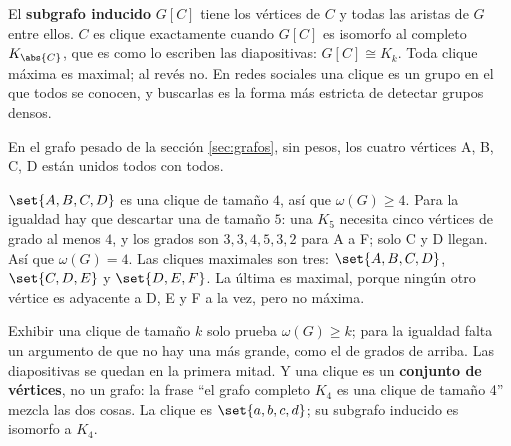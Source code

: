 \documentclass[11pt,letterpaper]{article}
\begin{document}
El \textbf{subgrafo inducido} $G[C]$ tiene los vértices de $C$ y todas
las aristas de $G$ entre ellos. $C$ es clique exactamente cuando
$G[C]$ es isomorfo al completo $K_{\abs{C}}$, que es como lo escriben
las diapositivas: $G[C] \cong K_k$. Toda clique máxima es maximal; al
revés no. En redes sociales una clique es un grupo en el que todos se
conocen, y buscarlas es la forma más estricta de detectar grupos
densos.

\begin{ejemplo}
  \label{ej:clique-pesado}
  En el grafo pesado de la sección \ref{sec:grafos}, sin pesos, los
  cuatro vértices A, B, C, D están unidos todos con todos.
  \begin{center}
  \end{center}
  $\set{A, B, C, D}$ es una clique de tamaño $4$, así que
  $\omega(G) \ge 4$. Para la igualdad hay que descartar una de tamaño
  $5$: una $K_5$ necesita cinco vértices de grado al menos $4$, y los
  grados son $3, 3, 4, 5, 3, 2$ para A a F; solo C y D llegan. Así
  que $\omega(G) = 4$. Las cliques maximales son tres:
  $\set{A, B, C, D}$, $\set{C, D, E}$ y $\set{D, E, F}$. La última es
  maximal, porque ningún otro vértice es adyacente a D, E y F a la
  vez, pero no máxima.
\end{ejemplo}

\begin{ojo}
  Exhibir una clique de tamaño $k$ solo prueba $\omega(G) \ge k$; para
  la igualdad falta un argumento de que no hay una más grande, como
  el de grados de arriba. Las diapositivas se quedan en la primera
  mitad. Y una clique es un \textbf{conjunto de vértices}, no un
  grafo: la frase ``el grafo completo $K_4$ es una clique de tamaño
  4'' mezcla las dos cosas. La clique es $\set{a, b, c, d}$; su
  subgrafo inducido es isomorfo a $K_4$.
\end{ojo}
\end{document}
